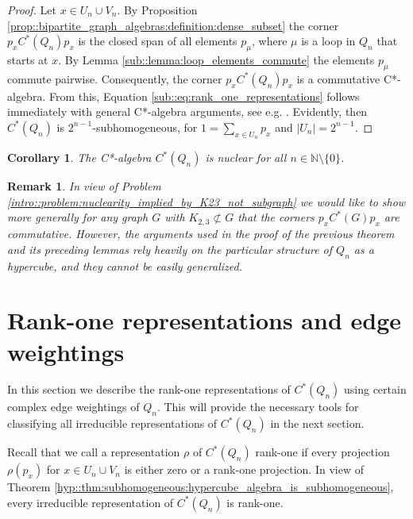 \documentclass[a4paper]{amsart}
\newcommand{\N}{\mathbb{N}}
\newtheorem{corollary}[thm]{Corollary}
\newtheorem{remark}[thm]{Remark}
\begin{document}
\begin{proof}
    Let $x \in U_n \cup V_n$. By Proposition \ref{prop::bipartite_graph_algebras:definition:dense_subset} the corner $p_x C^\ast(Q_n) p_x$ is the closed span of all elements $p_\mu$, where $\mu$ is a loop in $Q_n$ that starts at $x$. By Lemma \ref{sub::lemma:loop_elements_commute} the elements $p_\mu$ commute pairwise. Consequently, the corner $p_x C^\ast(Q_n) p_x$ is a commutative C*-algebra. From this, Equation \eqref{sub::eq:rank_one_representations} follows immediately with general C*-algebra arguments, see e.g. \cite[IV.1.1.7]{blackadar_operator_2006}. Evidently, then $C^\ast(Q_n)$ is $2^{n-1}$-subhomogeneous, for $1 = \sum_{x \in U_n} p_x$ and $|U_n| = 2^{n-1}$.
\end{proof}

\begin{corollary}
    The C*-algebra $C^\ast(Q_n)$ is nuclear for all $n \in \N \setminus \{0\}$.
\end{corollary}

\begin{remark}
    In view of Problem \ref{intro::problem:nuclearity_implied_by_K23_not_subgraph} we would like to show more generally for any graph $G$ with $K_{2,3} \not \subset G$ that the corners $p_x C^\ast(G) p_x$ are commutative.
    However, the arguments used in the proof of the previous theorem and its preceding lemmas rely heavily on the particular structure of $Q_n$ as a hypercube, and they cannot be easily generalized.
\end{remark}


\section{Rank-one representations and edge weightings}
\label{sec::hypercube_rank_one_representations}

In this section we describe the rank-one representations of $C^\ast(Q_n)$ using certain complex edge weightings of $Q_n$. This will provide the necessary tools for classifying all irreducible representations of $C^\ast(Q_n)$ in the next section.

Recall that we call a representation $\rho$ of $C^\ast(Q_n)$ rank-one if every projection $\rho(p_x)$ for $x \in U_n \cup V_n$ is either zero or a rank-one projection. In view of Theorem \ref{hyp::thm:subhomogeneous:hypercube_algebra_is_subhomogeneous}, every irreducible representation of $C^\ast(Q_n)$ is rank-one. 
\end{document}
